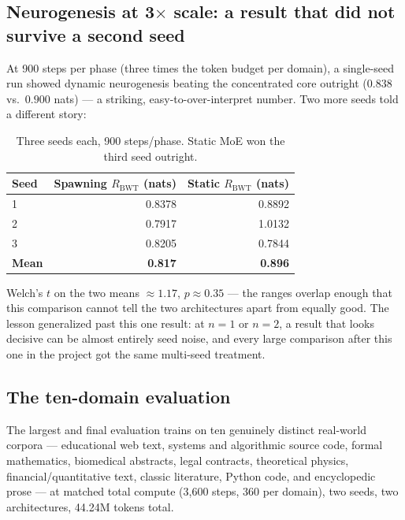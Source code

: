 \documentclass[11pt,letterpaper]{article}
\begin{document}
\subsection{Neurogenesis at 3\texorpdfstring{$\times$}{x} scale: a result that did not survive a second seed}
\label{sec:3xscale}

At 900 steps per phase (three times the token budget per domain), a single-seed run showed dynamic neurogenesis beating the concentrated core outright ($0.838$ vs.\ $0.900$ nats) --- a striking, easy-to-over-interpret number. Two more seeds told a different story:

\begin{table}[h]
\centering
\small
\begin{tabular}{lrr}
\toprule
Seed & Spawning $R_{\text{BWT}}$ (nats) & Static $R_{\text{BWT}}$ (nats) \\
\midrule
1 & 0.8378 & 0.8892 \\
2 & 0.7917 & 1.0132 \\
3 & 0.8205 & 0.7844 \\
\midrule
\textbf{Mean} & \textbf{0.817} & \textbf{0.896} \\
\bottomrule
\end{tabular}
\caption{Three seeds each, 900 steps/phase. Static MoE won the third seed outright.}
\label{tab:3xscale}
\end{table}

\noindent Welch's $t$ on the two means $\approx 1.17$, $p \approx 0.35$ --- the ranges overlap enough that this comparison cannot tell the two architectures apart from equally good. The lesson generalized past this one result: at $n=1$ or $n=2$, a result that looks decisive can be almost entirely seed noise, and every large comparison after this one in the project got the same multi-seed treatment.

\subsection{The ten-domain evaluation}
\label{sec:ten-domain}

The largest and final evaluation trains on ten genuinely distinct real-world corpora --- educational web text, systems and algorithmic source code, formal mathematics, biomedical abstracts, legal contracts, theoretical physics, financial/quantitative text, classic literature, Python code, and encyclopedic prose --- at matched total compute (3{,}600 steps, 360 per domain), two seeds, two architectures, 44.24M tokens total.
\end{document}
